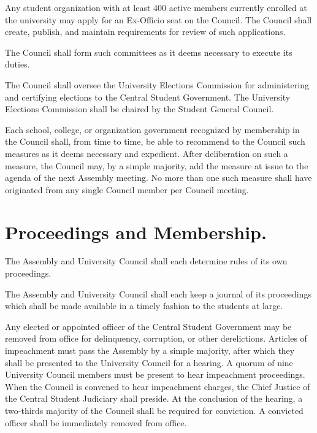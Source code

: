     Any student organization with at least 400 active members currently enrolled at the university may apply for an Ex-Officio seat on the Council. The Council shall create, publish, and maintain requirements for review of such applications.

    The Council shall form such committees as it deems necessary to execute its duties.

    The Council shall oversee the University Elections Commission for administering and certifying elections to the Central Student Government. The University Elections Commission shall be chaired by the Student General Council.

    Each school, college, or organization government recognized by membership in the Council shall, from time to time, be able to recommend to the Council such measures as it deems necessary and expedient. After deliberation on such a measure, the Council may, by a simple majority, add the measure at issue to the agenda of the next Assembly meeting. No more than one such measure shall have originated from any single Council member per Council meeting.

\section{Proceedings and Membership.}
    The Assembly and University Council shall each determine rules of its own proceedings.

    The Assembly and University Council shall each keep a journal of its proceedings which shall be made available in a timely fashion to the students at large.


    Any elected or appointed officer of the Central Student Government may be removed from office for delinquency, corruption, or other derelictions. Articles of impeachment must pass the Assembly by a simple majority, after which they shall be presented to the University Council for a hearing. A quorum of nine University Council members must be present to hear impeachment proceedings. When the Council is convened to hear impeachment charges, the Chief Justice of the Central Student Judiciary shall preside. At the conclusion of the hearing, a two-thirds majority of the Council shall be required for conviction. A convicted officer shall be immediately removed from office.

